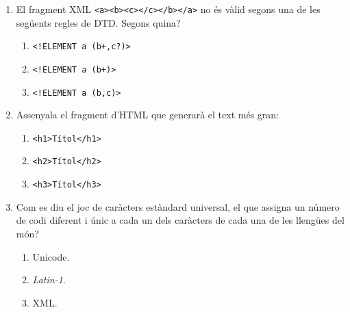 \begin{enumerate}
\item El fragment XML \texttt{<a><b><c></c></b></a>} no és vàlid segons una de les següents regles de DTD. Segons quina?  
  \begin{enumerate}
  \item \texttt{<!ELEMENT a (b+,c?)>}
  \item \texttt{<!ELEMENT a (b+)>}
  \item \texttt{<!ELEMENT a (b,c)>}
  \end{enumerate}

\item  Assenyala el fragment d'HTML que generarà el text més gran:  
  \begin{enumerate}
  \item \texttt{<h1>Títol</h1>}
  \item \texttt{<h2>Títol</h2>}
  \item \texttt{<h3>Títol</h3>}
  \end{enumerate}

\item Com es diu el joc de caràcters estàndard universal, el que assigna un número de codi diferent i únic a cada un dels caràcters de cada una de les llengües del món?  
  \begin{enumerate}
  \item Unicode.
  \item \emph{Latin-1}.
  \item XML.
  \end{enumerate}


\end{enumerate}

